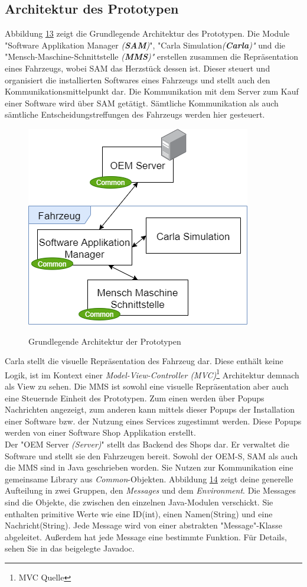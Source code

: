 \subsection{Architektur des Prototypen}	
Abbildung \hyperref[img:basic]{13} zeigt die Grundlegende Architektur des Prototypen. Die Module "Software Applikation Manager \textit{(\textbf{SAM})}", "Carla Simulation\textit{(\textbf{Carla})"} und die "Mensch-Maschine-Schnittstelle \textit{(\textbf{MMS})"} erstellen zusammen die Repräsentation eines Fahrzeugs, wobei SAM das Herzstück dessen ist. Dieser steuert und organisiert die installierten Softwares eines Fahrzeugs und stellt auch den Kommunikationsmittelpunkt dar. Die Kommunikation mit dem Server zum Kauf einer Software wird über SAM getätigt. Sämtliche Kommunikation als auch sämtliche Entscheidungstreffungen des Fahrzeugs werden hier gesteuert. 
\begin{figure}[!h]
	\centering
	\includegraphics[width=0.5\columnwidth]{pictures/konzept-basic.png}
	\label{img:basic}
	\caption{Grundlegende Architektur der Prototypen}
\end{figure}
Carla stellt die visuelle Repräsentation des Fahrzeug dar. Diese enthält keine Logik, ist im Kontext einer \textit{Model-View-Controller (MVC)}\footnote{MVC Quelle} Architektur demnach als View zu sehen. Die MMS ist sowohl eine visuelle Repräsentation aber auch eine Steuernde Einheit des Prototypen. Zum einen werden über Popups Nachrichten angezeigt, zum anderen kann mittels dieser Popups der Installation einer Software bzw. der Nutzung eines Services zugestimmt werden. Diese Popups werden von einer Software Shop Applikation erstellt.\\
Der "OEM Server \textit{(Server)}" stellt das Backend des Shops dar. Er verwaltet die Software und stellt sie den Fahrzeugen bereit. Sowohl der OEM-S, SAM als auch die MMS sind in Java geschrieben worden. Sie Nutzen zur Kommunikation eine gemeinsame Library aus \textit{Common}-Objekten. Abbildung \hyperref[img:common]{14} zeigt deine generelle Aufteilung in zwei Gruppen, den \textit{Messages} und dem \textit{Environment}. Die Messages sind die Objekte, die zwischen den einzelnen Java-Modulen verschickt. Sie enthalten primitive Werte wie eine ID(int), einen Namen(String) und eine Nachricht(String). Jede Message wird von einer abstrakten "Message"-Klasse abgeleitet. Außerdem hat jede Message eine bestimmte Funktion. Für Details, sehen Sie in das beigelegte Javadoc.
